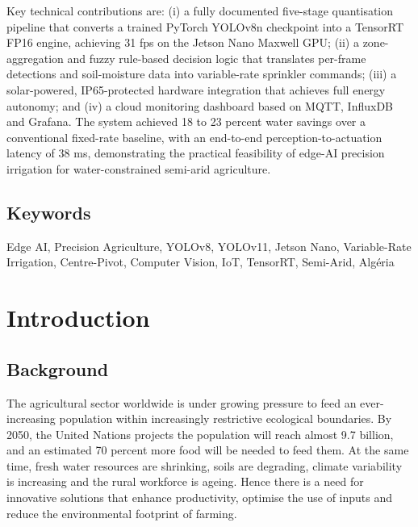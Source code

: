 \documentclass[12pt,a4paper]{report}
\begin{document}
Key technical contributions are: (i) a fully documented five-stage quantisation pipeline that converts a trained PyTorch YOLOv8n checkpoint into a TensorRT FP16 engine, achieving 31 fps on the Jetson Nano Maxwell GPU; (ii) a zone-aggregation and fuzzy rule-based decision logic that translates per-frame detections and soil-moisture data into variable-rate sprinkler commands; (iii) a solar-powered, IP65-protected hardware integration that achieves full energy autonomy; and (iv) a cloud monitoring dashboard based on MQTT, InfluxDB and Grafana. The system achieved 18 to 23 percent water savings over a conventional fixed-rate baseline, with an end-to-end perception-to-actuation latency of 38 ms, demonstrating the practical feasibility of edge-AI precision irrigation for water-constrained semi-arid agriculture.

\section*{Keywords}
Edge AI, Precision Agriculture, YOLOv8, YOLOv11, Jetson Nano, Variable-Rate Irrigation, Centre-Pivot, Computer Vision, IoT, TensorRT, Semi-Arid, Algéria

\newpage
\renewcommand{\contentsname}{Table of Contents}
{}
\tableofcontents
\newpage
{}
{}
\listoffigures
\newpage
{}
{}
\listoftables
\newpage
{}
\setcounter{page}{1}

\chapter{Introduction}
\pagestyle{fancy}
\thispagestyle{empty}

\section{Background}

The agricultural sector worldwide is under growing pressure to feed an ever-increasing population within increasingly restrictive ecological boundaries. By 2050, the United Nations projects the population will reach almost 9.7 billion, and an estimated 70 percent more food will be needed to feed them. At the same time, fresh water resources are shrinking, soils are degrading, climate variability is increasing and the rural workforce is ageing. Hence there is a need for innovative solutions that enhance productivity, optimise the use of inputs and reduce the environmental footprint of farming.
\end{document}
